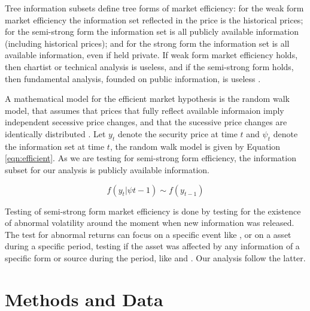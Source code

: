 \documentclass[a4paper]{article}
\begin{document}
\begin{comment}
providing accurate signals for resource allocation. Prices should reflect information as it reflects the forecasts of future prices, which should be revised with the arrival of new information.
\end{comment}

Tree information subsets define tree forms of market efficiency: for the weak form market efficiency the information set reflected in the price is the historical prices; for the semi-strong form the information set is all publicly available information (including historical prices); and for the strong form the information set is all available information, even if held private. If weak form market efficiency holds, then chartist or technical analysis is useless, and if the semi-strong form holds, then fundamental analysis, founded on public information, is useless \citet{oprean2012}.

A mathematical model for the efficient market hypothesis is the random walk model, that assumes that prices that fully reflect available informaion imply independent secessive price changes, and that the sucessive price changes are identically distributed \citet{fama1970} . Let $y_t$ denote the security price at time $t$ and $\psi_t$ denote the information set at time $t$, the random walk model is given by Equation \ref{eqn:efficient}. As we are testing for semi-strong form efficiency, the information subset for our analysis is publicly available information.

\begin{equation}
\label{eqn:efficient}
f ( y_t | \psi{t-1} ) \sim f(y_{t-1})
\end{equation}

Testing of semi-strong form market efficiency is done by testing for the existence of abnormal volatility around the moment when new information was released. The test for abnormal returns can focus on a specific event like \citet{gabrielribeiro2013}, or on a asset during a specific period, testing if the asset was affected by any information of a specific form or source during the period, like \citet{larsenthorsrud2017} and \citet{caporaleetal2015}. Our analysis follow the latter.


\section{Methods and Data}
\end{document}
